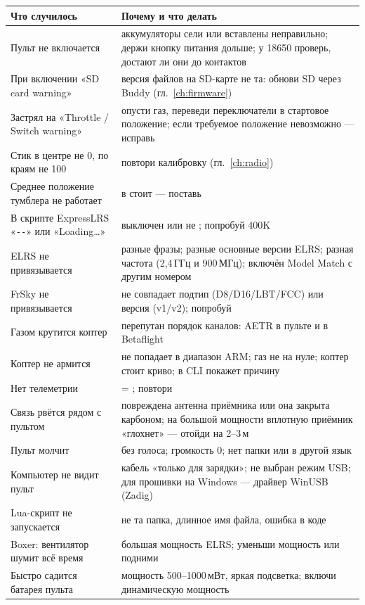 \begin{small}
\renewcommand{\arraystretch}{1.25}
\begin{longtable}{@{}L{50mm}L{110mm}@{}}
\toprule
\textbf{Что случилось} & \textbf{Почему и что делать} \\
\midrule
\endhead
Пульт не включается & аккумуляторы сели или вставлены неправильно; держи кнопку питания
  дольше; у 18650 проверь, достают ли они до контактов \\
При включении «SD card warning» & версия файлов на SD-карте не та: обнови SD через Buddy
  (гл.~\ref{ch:firmware}) \\
Застрял на «Throttle / Switch warning» & опусти газ, переведи переключатели в стартовое
  положение; если требуемое положение невозможно --- исправь  \\
Стик в центре не 0, по краям не 100 & повтори калибровку (гл.~\ref{ch:radio}) \\
Среднее положение тумблера не работает & в  стоит  --- поставь  \\
В скрипте ExpressLRS «\texttt{-{}-}» или «Loading…» &  выключен или не ;
  попробуй  400K \\
ELRS не привязывается & разные фразы; разные основные версии ELRS; разная частота (2,4\,ГГц и
  900\,МГц); включён Model Match с другим номером \\
FrSky не привязывается & не совпадает подтип (D8/D16/LBT/FCC) или версия (v1/v2);
  попробуй  \\
Газом крутится коптер & перепутан порядок каналов: AETR в пульте и  в Betaflight \\
Коптер не армится &  не попадает в диапазон ARM; газ не на нуле; коптер стоит криво;
  в CLI  покажет причину \\
Нет телеметрии &  = ; повтори  \\
Связь рвётся рядом с пультом & повреждена антенна приёмника или она закрыта карбоном; на
  большой мощности вплотную приёмник «глохнет» --- отойди на 2--3\,м \\
Пульт молчит &  без голоса; громкость 0; нет папки  или в
   другой язык \\
Компьютер не видит пульт & кабель «только для зарядки»; не выбран режим USB; для прошивки на
  Windows --- драйвер WinUSB (Zadig) \\
Lua-скрипт не запускается & не та папка, длинное имя файла, ошибка в коде \\
Boxer: вентилятор шумит всё время & большая мощность ELRS; уменьши мощность или подними  \\
Быстро садится батарея пульта & мощность 500--1000\,мВт, яркая подсветка; включи динамическую мощность \\
\bottomrule
\end{longtable}
\end{small}


